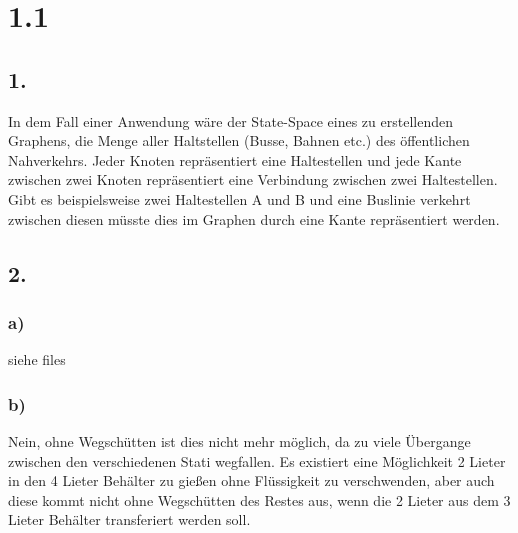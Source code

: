 \documentclass[a4paper,11pt,fleqn]{scrartcl}
\title{\titleinfo}
\author{\authorinfo}
\begin{document}
\maketitle

\section*{1.1}
\subsection*{1.}
In dem Fall einer Anwendung wäre der State-Space eines zu erstellenden Graphens, die Menge aller Haltstellen (Busse, Bahnen etc.) des öffentlichen Nahverkehrs. Jeder Knoten repräsentiert eine Haltestellen und jede Kante zwischen zwei Knoten repräsentiert eine Verbindung zwischen zwei Haltestellen. Gibt es beispielsweise zwei Haltestellen A und B und eine Buslinie verkehrt zwischen diesen müsste dies im Graphen durch eine Kante repräsentiert werden.  
\subsection*{2.}
\subsubsection*{a)}
siehe files
\subsubsection*{b)}
Nein, ohne Wegschütten ist dies nicht mehr möglich, da zu viele Übergange zwischen den verschiedenen Stati wegfallen. Es existiert eine Möglichkeit 2 Lieter in den 4 Lieter Behälter zu gießen ohne Flüssigkeit zu verschwenden, aber auch diese kommt nicht ohne Wegschütten des Restes aus, wenn die 2 Lieter aus dem 3 Lieter Behälter transferiert werden soll.
\end{document}
